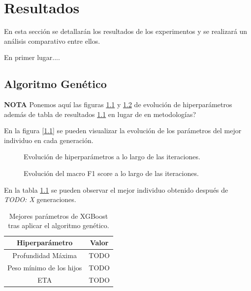 
\chapter{Resultados}
\label{resultados}



  En esta sección se detallarán los resultados de los experimentos y se realizará un análisis comparativo entre ellos.


  En primer lugar....

\section{Algoritmo Genético}

  \textbf{NOTA} Ponemos aquí las figuras \ref{EvolucionHiperparametrosImage} y \ref{EvolucionF1ScoreImage} de evolución de hiperparámetros además de tabla de resultados \ref{BestGASolutionTable} en lugar de en metodologías?

  En la figura [\ref{EvolucionHiperparametrosImage}] se pueden visualizar la evolución de los parámetros del mejor individuo en cada generación.

  \begin{figure}[H]
      \centering
      
      \caption{Evolución de hiperparámetros a lo largo de las iteraciones.}
      \label{EvolucionHiperparametrosImage}
   \end{figure}

  \begin{figure}[H]
      \centering
      
      \caption{Evolución del macro F1 score a lo largo de las iteraciones.}
      \label{EvolucionF1ScoreImage}
   \end{figure}

  En la tabla \ref{BestGASolutionTable} se pueden observar el mejor individuo obtenido después de \textit{TODO: X} generaciones.

  \begin{table}[H]
      \centering
          \begin{tabular}{ |c|c| } 
              \hline
              \textbf{Hiperparámetro} & \textbf{Valor}\\
              \hline
                  Profundidad Máxima & TODO \\ 
                  Peso mínimo de los hijos & TODO \\ 
                  ETA & TODO \\ 
              \hline

          \end{tabular}
      \caption{Mejores parámetros de XGBoost tras aplicar el algoritmo genético.}
      \label{BestGASolutionTable}
  \end{table}

